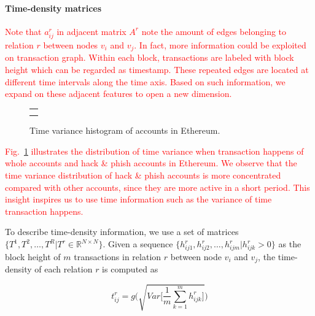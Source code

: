 \paragraph{Time-density matrices}
\textcolor{red}{Note that $a^r_{ij}$ in adjacent matrix $A^r$ note the amount of edges belonging to relation $r$ between nodes $v_i$ and $v_j$.}
\textcolor{red}{In fact, more information could be exploited on transaction graph. Within each block, transactions are labeled with block height which can be regarded as timestamp. These repeated edges are located at different time intervals along the time axis. Based on such information, we expand on these adjacent features to open a new dimension.}


\begin{figure}[htbp]
\centering
\begin{tabular}{c}
	\subfigure[Time variance histogram of whole nodes.]{
		\label{fig:high_order}
    
	}\\
	\subfigure[Time variance histogram of hack\&phish nodes.]{
		\label{fig:asymmetric}
    
	}
\end{tabular}
\caption{Time variance histogram of accounts in Ethereum.}
\label{fig:time_std}
\end{figure}

\textcolor{red}{Fig.~\ref{fig:time_std} illustrates the distribution of time variance when transaction happens of whole accounts and hack \& phish accounts in Ethereum. We observe that the time variance distribution of hack \& phish accounts is more concentrated compared with other accounts, since they are more active in a short period. This insight inspires us to use time information such as the variance of time transaction happens.}

To describe time-density information, we use a set of matrices $\{T^1,T^2,\dots,T^R|T^r\in \mathbb{R}^{N \times N}\}$. Given a sequence $\{h_{ij1}^r,h_{ij2}^r,\dots,h_{ijm}^r | h_{ijk}^r>0\}$ as the block height of $m$ transactions in relation $r$ between node $v_i$ and $v_j$, the time-density of each relation $r$ is computed as%

\begin{equation}
t_{ij}^r=g\Bigg(\sqrt{Var\Big[\frac{1}{m}\sum_{k=1}^m h_{ijk}^r\Big]}\Bigg)
\label{eq:time}
\end{equation}

